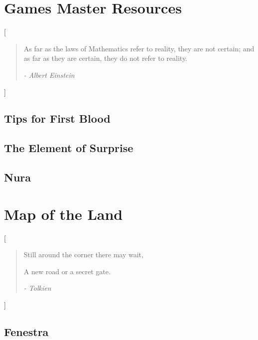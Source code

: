 \documentclass[a4paper,openany]{report}
\begin{document}

\tableofcontents

\pagebreak




\part{Games Master Resources}
[\vspace{4cm}\begin{quote}
\center As far as the laws of Mathematics refer to reality, they are not certain; and as far as they are certain, they do not refer to reality.

\flushright	\textit{- Albert Einstein}
\end{quote}]


\chapter{Tips for First Blood}



\chapter[Random Things]{The Element of Surprise}



\chapter{Nura}



\part{Map of the Land}
[\vspace{4cm}\center \begin{quote}Still around the corner there may wait,

A new road or a secret gate.

	\flushright\textit{- Tolkien}
\end{quote}]

\chapter{Fenestra}
\end{document}
